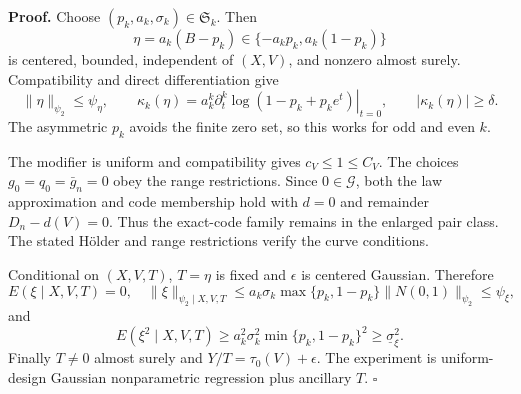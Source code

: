 \textbf{Proof.}
Choose \((p_k,a_k,\sigma_k)\in\mathfrak S_k\). Then
\[
 \eta=a_k(B-p_k)\in\{-a_kp_k,a_k(1-p_k)\}
\]
is centered, bounded, independent of \((X,V)\), and nonzero almost surely. Compatibility and direct differentiation give
\[
 \|\eta\|_{\psi_2}\le\psi_\eta,\qquad
 \kappa_k(\eta)=a_k^k\left.\partial_t^k\log(1-p_k+p_ke^t)\right|_{t=0},
 \qquad |\kappa_k(\eta)|\ge\delta. \tag{1}
\]
The asymmetric \(p_k\) avoids the finite zero set, so this works for odd and even \(k\).

The modifier is uniform and compatibility gives \(c_V\le1\le C_V\). The choices \(g_0=q_0=\bar g_n=0\) obey the range restrictions. Since \(0\in\mathcal G\), both the law approximation and code membership hold with \(d=0\) and remainder \(D_n-d(V)=0\). Thus the exact-code family remains in the enlarged pair class. The stated H\"older and range restrictions verify the curve conditions.

Conditional on \((X,V,T)\), \(T=\eta\) is fixed and \(\epsilon\) is centered Gaussian. Therefore
\[
 E(\xi\mid X,V,T)=0,
 \quad \|\xi\|_{\psi_2\mid X,V,T}
 \le a_k\sigma_k\max\{p_k,1-p_k\}\|N(0,1)\|_{\psi_2}\le\psi_\xi, \tag{2}
\]
and
\[
 E(\xi^2\mid X,V,T)
 \ge a_k^2\sigma_k^2\min\{p_k,1-p_k\}^2
 \ge\underline\sigma_\xi^2. \tag{3}
\]
Finally \(T\ne0\) almost surely and \(Y/T=\tau_0(V)+\epsilon\). The experiment is uniform-design Gaussian nonparametric regression plus ancillary \(T\). \(\square\)